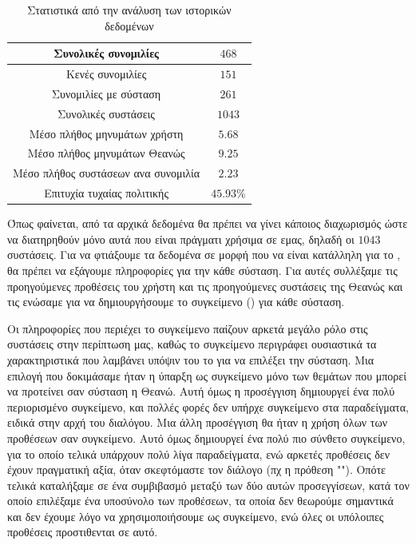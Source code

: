 \begin{table}
    \centering
    \begin{tabular}{|c|c|}
        \hline
        Συνολικές συνομιλίες                & $468$     \\
        \hline
        Κενές συνομιλίες                    & $151$     \\
        \hline
        Συνομιλίες με σύσταση               & $261$     \\
        \hline
        Συνολικές συστάσεις                 & $1043$    \\
        \hline
        Μέσο πλήθος μηνυμάτων χρήστη        & $5.68$    \\
        \hline
        Μέσο πλήθος μηνυμάτων Θεανώς        & $9.25$    \\
        \hline
        Μέσο πλήθος συστάσεων ανα συνομιλία & $2.23$    \\
        \hline
        Επιτυχία τυχαίας πολιτικής          & $45.93\%$ \\
        \hline
    \end{tabular}
    \caption{Στατιστικά από την ανάλυση των ιστορικών δεδομένων}
    \label{tab:historic_data}
\end{table}

Όπως φαίνεται, από τα αρχικά δεδομένα θα πρέπει να γίνει κάποιος διαχωρισμός ώστε να διατηρηθούν μόνο αυτά που είναι πράγματι χρήσιμα σε εμας, δηλαδή οι $1043$ συστάσεις. Για να φτιάξουμε τα δεδομένα σε μορφή που να είναι κατάλληλη για το , θα πρέπει να εξάγουμε πληροφορίες για την κάθε σύσταση. Για αυτές συλλέξαμε τις προηγούμενες προθέσεις του χρήστη και τις προηγούμενες συστάσεις της Θεανώς και τις ενώσαμε για να δημιουργήσουμε το συγκείμενο () για κάθε σύσταση.

Οι πληροφορίες που περιέχει το συγκείμενο παίζουν αρκετά μεγάλο ρόλο στις συστάσεις στην περίπτωση μας, καθώς το συγκείμενο περιγράφει ουσιαστικά τα χαρακτηριστικά που λαμβάνει υπόψιν του το  για να επιλέξει την σύσταση. Μια επιλογή που δοκιμάσαμε ήταν η ύπαρξη ως συγκείμενο μόνο των θεμάτων που μπορεί να προτείνει σαν σύσταση η Θεανώ. Αυτή όμως η προσέγγιση δημιουργεί ένα πολύ περιορισμένο συγκείμενο, και πολλές φορές δεν υπήρχε συγκείμενο στα παραδείγματα, ειδικά στην αρχή του διαλόγου. Μια άλλη προσέγγιση θα ήταν η χρήση όλων των προθέσεων σαν συγκείμενο. Αυτό όμως δημιουργεί ένα πολύ πιο σύνθετο συγκείμενο, για το οποίο τελικά υπάρχουν πολύ λίγα παραδείγματα, ενώ αρκετές προθέσεις δεν έχουν πραγματική αξία, όταν σκεφτόμαστε τον διάλογο (πχ η πρόθεση ""). Οπότε τελικά καταλήξαμε σε ένα συμβιβασμό μεταξύ των δύο αυτών προσεγγίσεων, κατά τον οποίο επιλέξαμε ένα υποσύνολο των προθέσεων, τα οποία δεν θεωρούμε σημαντικά και δεν έχουμε λόγο να χρησιμοποιήσουμε ως συγκείμενο, ενώ όλες οι υπόλοιπες προθέσεις προστιθενται σε αυτό.

